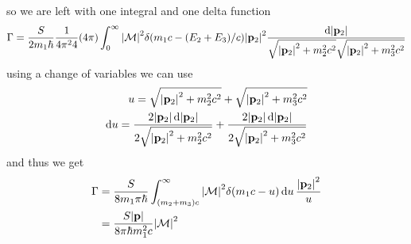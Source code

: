 \documentclass[../main.tex]{subfiles}
\begin{document}
so we are left with one integral and one delta function
\begin{align*}
    \Gamma = \frac{S}{2m_1\hbar} \frac{1}{4\pi^2 4} (4\pi) \int_0^\infty \abs{\mathcal{M}}^2
    \delta(m_1 c - (E_2 + E_3)/c) \abs{\vb p_2}^2 \frac{\dd{\abs{\vb p_2}}}
    {\sqrt{\abs{\vb p_2}^2 + m_2^2 c^2} \sqrt{\abs{\vb p_2}^2 + m_3^2 c^2}}
\end{align*}
using a change of variables we can use
\begin{align*}
    u = \sqrt{\abs{\vb p_2}^2 + m_2^2 c^2} + \sqrt{\abs{\vb p_2}^2 + m_3^2 c^2} \\
    \dd{u} = \frac{2\abs{\vb p_2} \dd{\abs{\vb p_2}}}{2\sqrt{\abs{\vb p_2}^2 + m_2^2 c^2}} 
    + \frac{2\abs{\vb p_2} \dd{\abs{\vb p_2}}}{2\sqrt{\abs{\vb p_2}^2 + m_3^2 c^2}}
\end{align*}
and thus we get
\begin{align*}
    \Gamma &= \frac{S}{8m_1 \pi \hbar} \int_{(m_2 + m_3)c}^\infty \abs{\mathcal{M}}^2 \delta(m_1 c - u) \dd{u}
    \frac{\abs{\vb p_2}^2}{u} \\
    &= \frac{S \abs{\vb p}}{8\pi \hbar m_1^2 c} \abs{\mathcal{M}}^2
\end{align*}

\newpage
{}
\end{document}
